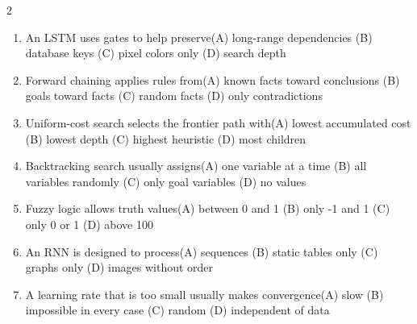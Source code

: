 \documentclass[a4paper]{article}
\begin{document}
\begin{multicols*}{2}
\begin{enumerate}[resume]
\item An LSTM uses gates to help preserve\newline\hspace*{0.6em}(A) long-range dependencies \quad (B) database keys \newline\hspace*{0.6em}(C) pixel colors only \quad (D) search depth
\item Forward chaining applies rules from\newline\hspace*{0.6em}(A) known facts toward conclusions \quad (B) goals toward facts \newline\hspace*{0.6em}(C) random facts \quad (D) only contradictions
\item Uniform-cost search selects the frontier path with\newline\hspace*{0.6em}(A) lowest accumulated cost \quad (B) lowest depth \newline\hspace*{0.6em}(C) highest heuristic \quad (D) most children
\item Backtracking search usually assigns\newline\hspace*{0.6em}(A) one variable at a time \quad (B) all variables randomly \newline\hspace*{0.6em}(C) only goal variables \quad (D) no values
\item Fuzzy logic allows truth values\newline\hspace*{0.6em}(A) between 0 and 1 \quad (B) only -1 and 1 \newline\hspace*{0.6em}(C) only 0 or 1 \quad (D) above 100
\item An RNN is designed to process\newline\hspace*{0.6em}(A) sequences \quad (B) static tables only \newline\hspace*{0.6em}(C) graphs only \quad (D) images without order
\item A learning rate that is too small usually makes convergence\newline\hspace*{0.6em}(A) slow \quad (B) impossible in every case \newline\hspace*{0.6em}(C) random \quad (D) independent of data

\end{enumerate}
\end{multicols*}
\end{document}
